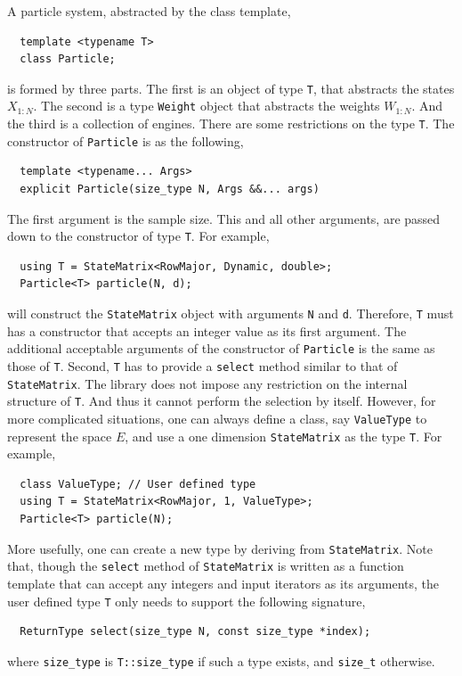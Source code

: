 A particle system, abstracted by the class template,
\begin{Verbatim}
  template <typename T>
  class Particle;
\end{Verbatim}
is formed by three parts. The first is an object of type \verb|T|, that
abstracts the states $X_{1:N}$. The second is a type \verb|Weight| object that
abstracts the weights $W_{1:N}$. And the third is a collection of \rng engines.
There are some restrictions on the type \verb|T|. The constructor of
\verb|Particle| is as the following,
\begin{Verbatim}
  template <typename... Args>
  explicit Particle(size_type N, Args &&... args)
\end{Verbatim}
The first argument is the sample size. This and all other arguments, are passed
down to the constructor of type \verb|T|. For example,
\begin{Verbatim}
  using T = StateMatrix<RowMajor, Dynamic, double>;
  Particle<T> particle(N, d);
\end{Verbatim}
will construct the \verb|StateMatrix| object with arguments \verb|N| and
\verb|d|. Therefore, \verb|T| must has a constructor that accepts an integer
value as its first argument. The additional acceptable arguments of the
constructor of \verb|Particle| is the same as those of \verb|T|. Second,
\verb|T| has to provide a \verb|select| method similar to that of
\verb|StateMatrix|. The library does not impose any restriction on the internal
structure of \verb|T|. And thus it cannot perform the selection by itself.
However, for more complicated situations, one can always define a class, say
\verb|ValueType| to represent the space $E$, and use a one dimension
\verb|StateMatrix| as the type \verb|T|. For example,
\begin{Verbatim}
  class ValueType; // User defined type
  using T = StateMatrix<RowMajor, 1, ValueType>;
  Particle<T> particle(N);
\end{Verbatim}
More usefully, one can create a new type by deriving from \verb|StateMatrix|.
Note that, though the \verb|select| method of \verb|StateMatrix| is written as
a function template that can accept any integers and input iterators as its
arguments, the user defined type \verb|T| only needs to support the following
signature,
\begin{Verbatim}
  ReturnType select(size_type N, const size_type *index);
\end{Verbatim}
where \verb|size_type| is \verb|T::size_type| if such a type exists, and
\verb|size_t| otherwise.

